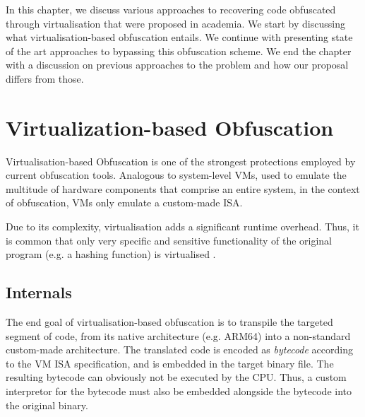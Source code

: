 In this chapter, we discuss various approaches to recovering code obfuscated through virtualisation that were proposed in academia. We start by discussing what virtualisation-based obfuscation entails. We continue with presenting state of the art approaches to bypassing this obfuscation scheme. We end the chapter with a discussion on previous approaches to the problem and how our proposal differs from those.

\section{Virtualization-based Obfuscation}

Virtualisation-based Obfuscation is one of the strongest protections employed by current obfuscation tools. Analogous to system-level \glspl{VM}, used to emulate the multitude of hardware components that comprise an entire system, in the context of obfuscation, \glspl{VM} only emulate a custom-made \gls{ISA}. 

Due to its complexity, virtualisation adds a significant runtime overhead. Thus, it is common that only very specific and sensitive functionality of the original program (e.g. a hashing function) is virtualised \cite{kochberger2021sok}.

\subsection{Internals}

The end goal of virtualisation-based obfuscation is to transpile the targeted segment of code, from its native architecture (e.g. ARM64) into a non-standard custom-made architecture. The translated code is encoded as \emph{bytecode} according to the \gls{VM} \gls{ISA} specification, and is embedded in the target binary file. The resulting bytecode can obviously not be executed by the \gls{CPU}. Thus, a custom interpretor for the bytecode must also be embedded alongside the bytecode into the original binary.

